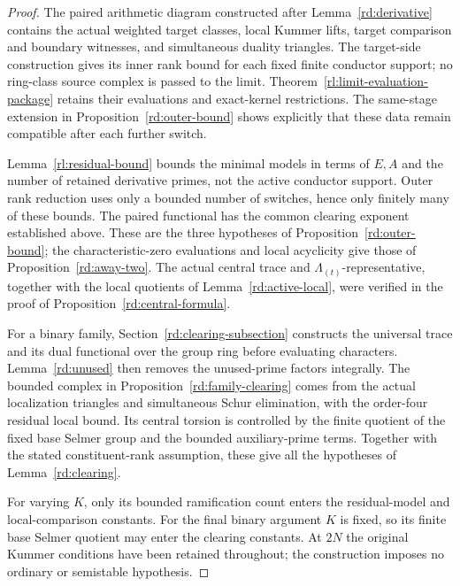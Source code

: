 \begin{proof}
The paired arithmetic diagram constructed after
Lemma~\ref{rd:derivative} contains the actual weighted target classes,
local Kummer lifts, target comparison and boundary witnesses, and
simultaneous duality triangles.  The target-side construction
gives its inner rank bound for each fixed finite conductor support;
no ring-class source complex is passed to the limit.
Theorem~\ref{rl:limit-evaluation-package} retains
their evaluations and exact-kernel restrictions.  The same-stage
extension in Proposition~\ref{rd:outer-bound} shows explicitly
that these data remain compatible after each further switch.

Lemma~\ref{rl:residual-bound} bounds the minimal models in terms
of \(E,A\) and the number of retained derivative primes, not the
active conductor support.  Outer rank reduction uses only a bounded
number of switches, hence only finitely many of these bounds.
The paired functional has the common clearing exponent established
above.  These are the three hypotheses of
Proposition~\ref{rd:outer-bound}; the characteristic-zero
evaluations and local acyclicity give those of
Proposition~\ref{rd:away-two}.  The actual central trace and
\(\Lambda_{(t)}\)-representative, together with the local
quotients of Lemma~\ref{rd:active-local}, were verified in the
proof of Proposition~\ref{rd:central-formula}.

For a binary family, Section~\ref{rd:clearing-subsection}
constructs the universal trace and its dual functional over the
group ring before evaluating characters.  Lemma~\ref{rd:unused}
then removes the unused-prime factors integrally.  The bounded
complex in Proposition~\ref{rd:family-clearing} comes from the
actual localization triangles and simultaneous Schur elimination,
with the order-four residual local bound.  Its central torsion is
controlled by the finite quotient of the fixed base Selmer group
and the bounded auxiliary-prime terms.  Together with the stated
constituent-rank assumption, these give all the hypotheses of
Lemma~\ref{rd:clearing}.

For varying \(K\), only its bounded ramification count enters
the residual-model and local-comparison constants.  For the final
binary argument \(K\) is fixed, so its finite base Selmer
quotient may enter the clearing constants.  At \(2N\) the
original Kummer conditions have been retained throughout; the
construction imposes no ordinary or semistable hypothesis.
\end{proof}

